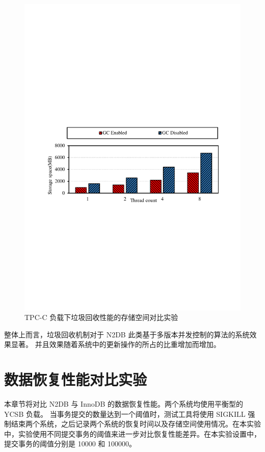 \begin{figure}
    \centering
    \includegraphics[width=15cm, trim={1cm 9cm 1cm 10cm}]{figures/gc-tpcc-storage.pdf}
    \caption{TPC-C 负载下垃圾回收性能的存储空间对比实验}
    \label{fig:gc-storage-tpcc}
\end{figure}

整体上而言，垃圾回收机制对于 N2DB 此类基于多版本并发控制的算法的系统效果显著。
并且效果随着系统中的更新操作的所占的比重增加而增加。


\section{数据恢复性能对比实验}

本章节将对比 N2DB 与 InnoDB 的数据恢复性能。两个系统均使用平衡型的 YCSB 负载。
当事务提交的数量达到一个阈值时，测试工具将使用 SIGKILL 强制结束两个系统，之后记录两个系统的恢复时间以及存储空间使用情况。在本实验中，实验使用不同提交事务的阈值来进一步对比恢复性能差异。在本实验设置中，提交事务的阈值分别是 10000 和 100000。

